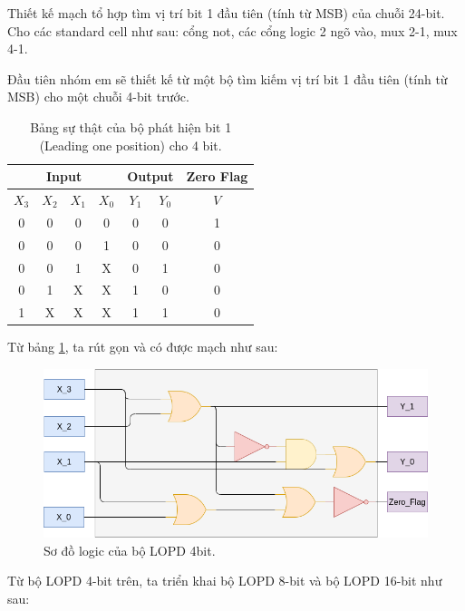 
Thiết kế mạch tổ hợp tìm vị trí bit 1 đầu tiên (tính từ MSB) của chuỗi 24-bit. Cho các standard cell như sau: cổng not, các cổng logic 2 ngõ vào, mux 2-1, mux 4-1.


Đầu tiên nhóm em sẽ thiết kế từ một bộ tìm kiếm vị trí bit 1 đầu tiên (tính từ MSB) cho một chuỗi 4-bit trước. 

\begin{table}[H]
	\centering
	\begin{tabular}{|c|c|c|c|c|c|c|}
		\hline
		\multicolumn{4}{|c|}{Input} & \multicolumn{2}{c|}{Output} & Zero Flag \\
		\hline
		$X_{3}$ & $X_{2}$ & $X_{1}$ & $X_{0}$ & $Y_{1}$ & $Y_{0}$ & $V$ \\
		\hline
		0 & 0 & 0 & 0 & 0 & 0 & 1 \\
		\hline
		0 & 0 & 0 & 1 & 0 & 0 & 0 \\
		\hline
		0 & 0 & 1 & X & 0 & 1 & 0 \\
		\hline
		0 & 1 & X & X & 1 & 0 & 0 \\
		\hline
		1 & X & X & X & 1 & 1 & 0 \\
		\hline
	\end{tabular}
	\caption{Bảng sự thật của bộ phát hiện bit 1 (Leading one position) cho 4 bit.}
	\label{tab:leading-one-4bit}
\end{table}

Từ bảng \ref{tab:leading-one-4bit}, ta rút gọn và có được mạch như sau:

\begin{figure}[H]
	\centering
	\includegraphics[width=.8\linewidth]{./my-chapters/my-diagrams/Question2/spec.png}
	\caption{Sơ đồ logic của bộ LOPD 4bit.}
\end{figure}

Từ bộ LOPD 4-bit trên, ta triển khai bộ LOPD 8-bit và bộ LOPD 16-bit như sau:

